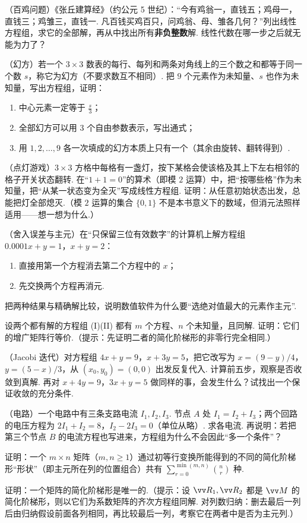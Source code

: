 {		\Cgroup
		\begin{exC}
			\item\label{ex:elim:C1} （百鸡问题）《张丘建算经》（约公元 5 世纪）：“今有鸡翁一，直钱五；鸡母一，直钱三；鸡雏三，直钱一. 凡百钱买鸡百只，问鸡翁、母、雏各几何？”列出线性方程组，求它的全部解，再从中找出所有\textbf{非负整数}解. 线性代数在哪一步之后就无能为力了？
			\item\label{ex:elim:C2} （幻方）若一个 $3\times3$ 数表的每行、每列和两条对角线上的三个数之和都等于同一个数 $s$，称它为幻方（不要求数互不相同）. 把 $9$ 个元素作为未知量、$s$ 也作为未知量，写出方程组，证明：
			\begin{enumerate}
				\item 中心元素一定等于 $\frac s3$；
				\item 全部幻方可以用 $3$ 个自由参数表示，写出通式；
				\item 用 $1,2,\ldots,9$ 各一次填成的幻方本质上只有一个（其余由旋转、翻转得到）.
			\end{enumerate}
			\item\label{ex:elim:C3} （点灯游戏）$3\times3$ 方格中每格有一盏灯，按下某格会使该格及其上下左右相邻的格子开关状态翻转. 在“$1+1=0$”的算术（即模 $2$ 运算）中，把“按哪些格”作为未知量，把“从某一状态变为全灭”写成线性方程组. 证明：从任意初始状态出发，总能把灯全部熄灭.（模 $2$ 运算的集合 $\{0,1\}$ 不是本书意义下的数域，但消元法照样适用——想一想为什么.）
			\item\label{ex:elim:C4} （舍入误差与主元）在“只保留三位有效数字”的计算机上解方程组 $0.0001x+y=1$，$x+y=2$：
			\begin{enumerate}
				\item 直接用第一个方程消去第二个方程中的 $x$；
				\item 先交换两个方程再消元.
			\end{enumerate}
			把两种结果与精确解比较，说明数值软件为什么要“选绝对值最大的元素作主元”.
			\item\label{ex:elim:C5} 设两个都有解的方程组 (I)(II) 都有 $m$ 个方程、$n$ 个未知量，且同解. 证明：它们的增广矩阵行等价.（提示：先证明二者的简化阶梯形的非零行完全相同.）
			\item\label{ex:elim:C6} （Jacobi 迭代）对方程组 $4x+y=9$，$x+3y=5$，把它改写为 $x=(9-y)/4$，$y=(5-x)/3$，从 $(x_0,y_0)=(0,0)$ 出发反复代入. 计算前五步，观察是否收敛到真解. 再对 $x+4y=9$，$3x+y=5$ 做同样的事，会发生什么？试找出一个保证收敛的充分条件.
			\item\label{ex:elim:C7} （电路）一个电路中有三条支路电流 $I_1,I_2,I_3$. 节点 $A$ 处 $I_1=I_2+I_3$；两个回路的电压方程为 $2I_1+I_2=8$，$I_2-2I_3=0$（单位从略）. 求各电流. 再说明：若把第三个节点 $B$ 的电流方程也写进来，方程组为什么不会因此“多一个条件”？
			\item\label{ex:elim:C8} 证明：一个 $m\times n$ 矩阵（$m,n\ge1$）通过初等行变换所能得到的不同的简化阶梯形“形状”（即主元所在列的位置组合）共有 $\sum_{r=0}^{\min(m,n)}\binom nr$ 种.
			\item\label{ex:elim:C9} 证明：一个矩阵的简化阶梯形是唯一的.（提示：设 $\vv R_1,\vv R_2$ 都是 $\vv M$ 的简化阶梯形，则以它们为系数矩阵的齐次方程组同解. 对列数归纳：删去最后一列后由归纳假设前面各列相同，再比较最后一列，考察它在两者中是否为主元列.）
		\end{exC}
	}
	
